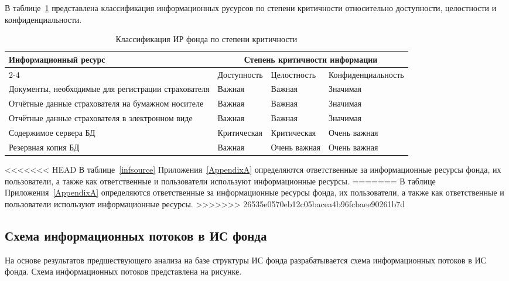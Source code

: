 \point В таблице~\ref{tab:inf_resource} представлена классификация информационных русурсов по степени критичности относительно доступности, целостности и конфиденциальности.

\begin{table}[h]
\caption{Классификация ИР фонда по степени критичности}
\label{tab:inf_resource}
\small
\begin{tabular}{|p{5cm}|p{3cm}|p{3cm}|p{3cm}|}
\hline
\multirow{3}{4cm}{Информационный ресурс} & \multicolumn{3}{c|}{Степень
  критичности информации}\\\cline{2-4}
& Доступность & Целостность & Конфиденциаль\-ность \\\hline
Документы, необходимые для регистрации страхователя & Важная & Важная
& Значимая\\\hline
Отчётные данные страхователя на бумажном носителе & Важная & Важная &
Значимая \\\hline
Отчётные данные страхователя в электронном виде & Важная & Важная &
Значимая \\\hline
Содержимое сервера БД & Критическая & Критическая & Очень важная
\\\hline
Резервная копия БД & Важная & Очень важная & Очень важная
\\\hline
\end{tabular}
\end{table}
\normalsize

<<<<<<< HEAD
\point В таблице~\ref{infsource} Приложения~\ref{AppendixA} определяются
ответственные за информационные ресурсы фонда, их пользователи, а
также как ответственные и пользователи используют информационные
ресурсы.
=======
\point В таблице~ Приложения~\ref{AppendixA} определяются ответственные за информационные ресурсы фонда, их пользователи, а также как ответственные и пользователи используют информационные ресурсы.
>>>>>>> 26535e0570eb12c05bacea4b96fcbaee90261b7d

\subsection{Схема информационных потоков в ИС фонда}

На основе результатов предшествующего анализа на базе структуры ИС
фонда разрабатывается схема информационных потоков в ИС фонда. Схема
информационных потоков представлена на рисунке.




